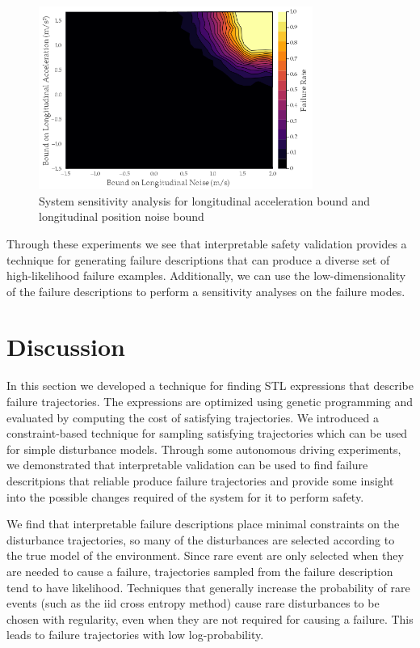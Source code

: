 \begin{figure}
    \centering
    \includegraphics[width=0.8\textwidth]{figures/interpretable_validation/state_dep_result_sensitivity.png}
    \caption{System sensitivity analysis for longitudinal acceleration bound and longitudinal position noise bound}
    \label{fig:ped_state_sensititivty}
\end{figure}

Through these experiments we see that interpretable safety validation provides a technique for generating failure descriptions that can produce a diverse set of high-likelihood failure examples. Additionally, we can use the low-dimensionality of the failure descriptions to perform a sensitivity analyses on the failure modes. 



\section{Discussion}
In this section we developed a technique for finding STL expressions that describe failure trajectories. The expressions are optimized using genetic programming and evaluated by computing the cost of satisfying trajectories. We introduced a constraint-based technique for sampling satisfying trajectories which can be used for simple disturbance models. Through some autonomous driving experiments, we demonstrated that interpretable validation can be used to find failure descritpions that reliable produce failure trajectories and provide some insight into the possible changes required of the system for it to perform safety.  

We find that interpretable failure descriptions place minimal constraints on the disturbance trajectories, so many of the disturbances are selected according to the true model of the environment. Since rare event are only selected when they are needed to cause a failure, trajectories sampled from the failure description tend to have likelihood. Techniques that generally increase the probability of rare events (such as the iid cross entropy method) cause rare disturbances to be chosen with regularity, even when they are not required for causing a failure. This leads to failure trajectories with low log-probability. 

